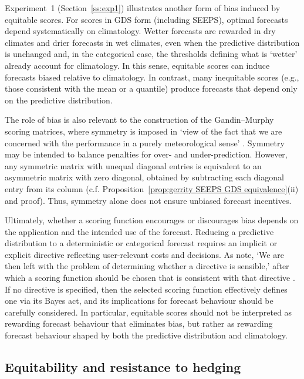 \documentclass[10pt]{article} %
\theoremstyle{theorem}
\theoremstyle{definition}
\begin{document}
Experiment~1 (Section~\ref{ss:exp1}) illustrates another form of bias induced by equitable scores. For scores in GDS form (including SEEPS), optimal forecasts depend systematically on climatology. Wetter forecasts are rewarded in dry climates and drier forecasts in wet climates, even when the predictive distribution is unchanged and, in the categorical case, the thresholds defining what is `wetter' already account for climatology. In this sense, equitable scores can induce forecasts biased relative to climatology. In contrast, many inequitable scores (e.g., those consistent with the mean or a quantile) produce forecasts that depend only on the predictive distribution.

The role of bias is also relevant to the construction of the Gandin--Murphy scoring matrices, where symmetry is imposed in `view of the fact that we are concerned with the performance in a purely meteorological sense' \citep{gandin1992equitable}. Symmetry may be intended to balance penalties for over- and under-prediction. However, any symmetric matrix with unequal diagonal entries is equivalent to an asymmetric matrix with zero diagonal, obtained by subtracting each diagonal entry from its column (c.f. Proposition~\ref{prop:gerrity SEEPS GDS equivalence}(ii) and proof). Thus, symmetry alone does not ensure unbiased forecast incentives.

Ultimately, whether a scoring function encourages or discourages bias depends on the application and the intended use of the forecast. Reducing a predictive distribution to a deterministic or categorical forecast requires an implicit or explicit directive reflecting user-relevant costs and decisions. As \citet{hogan2010equitability} note, `We are then left with the problem of determining whether a directive is sensible,' after which a scoring function should be chosen that is consistent with that directive \citep{murphy1985forecast, gneiting2011making, taggart2022scoring, taggart2025warnings}. If no directive is specified, then the selected scoring function effectively defines one via its Bayes act, and its implications for forecast behaviour should be carefully considered. In particular, equitable scores should not be interpreted as rewarding forecast behaviour that eliminates bias, but rather as rewarding forecast behaviour shaped by both the predictive distribution and climatology.

\subsection{Equitability and resistance to hedging}\label{ss:hedging}
\end{document}
